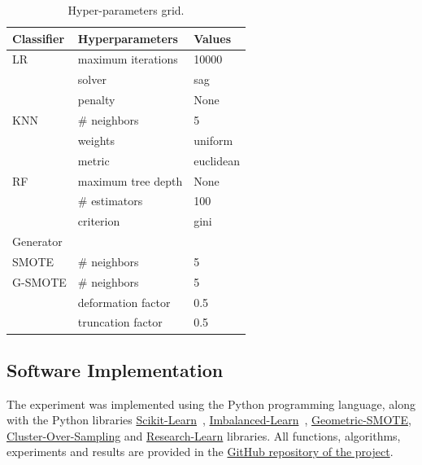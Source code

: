 \documentclass[parskip=full]{scrartcl}
\begin{document}
\begin{table}[H]
	\centering
	\begin{tabular}{lll}
		\toprule
		Classifier & Hyperparameters      & Values             \\
		\midrule
		LR         & maximum iterations   & 10000              \\
		           & solver               & sag                \\
                   & penalty              & None               \\
		KNN        & \# neighbors         & 5                  \\
                   & weights              & uniform            \\
                   & metric               & euclidean          \\
		RF         & maximum tree depth   & None               \\
		           & \# estimators        & 100                \\
                   & criterion            & gini               \\
		\toprule
		Generator  &                      &                    \\
		\midrule
		SMOTE      & \# neighbors         & 5                  \\
		G-SMOTE    & \# neighbors         & 5                  \\
                   & deformation factor   & 0.5                \\
                   & truncation factor    & 0.5                \\
		\bottomrule
	\end{tabular}
    \caption{\label{tab:grid}Hyper-parameters grid.}
\end{table}

\subsection{Software Implementation}

The experiment was implemented using the Python programming language, along with
the Python libraries
\href{https://scikit-learn.org/stable/}{Scikit-Learn}~\cite{Pedregosa2011},
\href{https://imbalanced-learn.org/en/stable/}{Imbalanced-Learn}~\cite{JMLR:v18:16-365},
\href{https://geometric-smote.readthedocs.io/en/latest/?badge=latest}{Geometric-SMOTE},
\href{https://cluster-over-sampling.readthedocs.io/en/latest/?badge=latest}{Cluster-Over-Sampling}
and
\href{https://research-learn.readthedocs.io/en/latest/?badge=latest}{Research-Learn}
libraries.  All functions, algorithms, experiments and results are provided in
the
\href{https://github.com/AlgoWit/publications/tree/master/remote-sensing/al-generator}{GitHub
repository of the project}.
\end{document}
